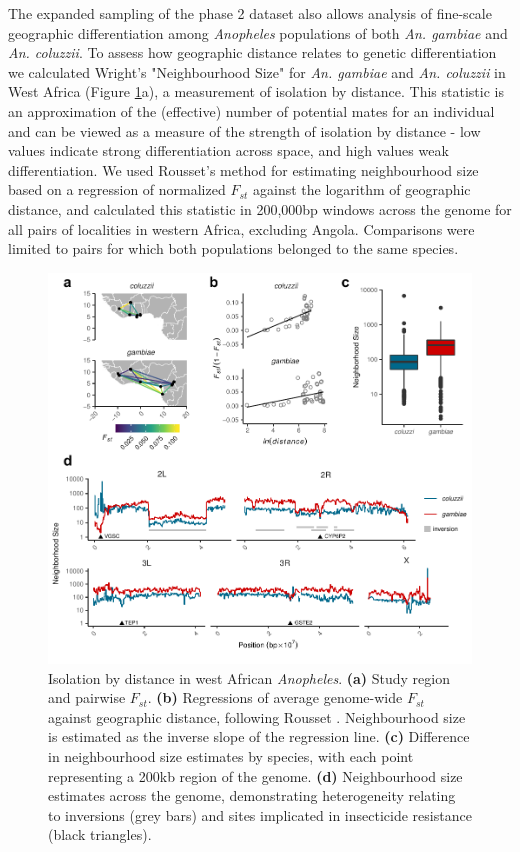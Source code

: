 \documentclass[a4paper,11pt,abstracton,hidelinks]{scrartcl}
\begin{document}
The expanded sampling of the phase 2 dataset also allows analysis of fine-scale geographic differentiation among \textit{Anopheles} populations of both \textit{An. gambiae} and \textit{An. coluzzii}.
%
To assess how geographic distance relates to genetic differentiation we calculated Wright's "Neighbourhood Size" \cite{wright1946isolation} for \textit{An. gambiae} and \textit{An. coluzzii} in West Africa (Figure \ref{fig:ibd_fig}a), a measurement of isolation by distance.
%
This statistic is an approximation of the (effective) number of potential mates for an individual and can be viewed as a measure of the strength of isolation by distance - low values indicate strong differentiation across space, and high values weak differentiation.
%
We used Rousset's \cite{rousset1997genetic} method for estimating neighbourhood size based on a regression of normalized $F_{st}$ against the logarithm of geographic distance, and calculated this statistic in 200,000bp windows across the genome for all pairs of localities in western Africa, excluding Angola. 
%
Comparisons were limited to pairs for which both populations belonged to the same species.



\begin{figure}[H]
	\begin{center}
		\includegraphics*[width=6.3in]{artwork/west_africa_multipanel_edit.pdf}
	\end{center}
	\caption{Isolation by distance in west African \textit{Anopheles}. \textbf{(a)} Study region and pairwise $F_{st}$. \textbf{(b)} Regressions of average genome-wide $F_{st}$ against geographic distance, following Rousset \cite{rousset1997genetic}. Neighbourhood size is estimated as the inverse slope of the regression line. \textbf{(c)} Difference in neighbourhood size estimates by species, with each point representing a 200kb region of the genome. \textbf{(d)} Neighbourhood size estimates across the genome, demonstrating heterogeneity relating to inversions (grey bars) and sites implicated in insecticide resistance (black triangles).}
	\label{fig:ibd_fig}
\end{figure}
\end{document}
